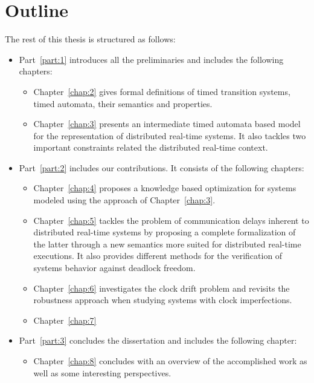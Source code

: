 \section{Outline}
The rest of this thesis is structured as follows:
\begin{itemize}
  \item Part~\ref{part:1} introduces all the preliminaries and includes the following chapters:
    \begin{itemize}
      \item Chapter~\ref{chap:2} gives formal definitions of timed transition systems,
        timed automata, their semantics and properties.
      \item Chapter~\ref{chap:3} presents an intermediate timed automata based model for 
        the representation of distributed real-time systems. It also tackles two important
        constraints related the distributed real-time context.
    \end{itemize}
  \item Part~\ref{part:2} includes our contributions. It consists of the following chapters:
    \begin{itemize}
      \item Chapter~\ref{chap:4} proposes a knowledge based optimization for systems modeled
        using the approach of Chapter~\ref{chap:3}.
      \item Chapter~\ref{chap:5} tackles the problem of communication delays inherent to
        distributed real-time systems by proposing a complete formalization of the latter through
        a new semantics more suited for distributed real-time executions. 
        It also provides different methods for the verification of systems behavior against 
        deadlock freedom.
      \item Chapter~\ref{chap:6} investigates the clock drift problem and revisits the robustness
        approach when studying systems with clock imperfections.    
      \item Chapter~\ref{chap:7}
    \end{itemize}
  \item Part~\ref{part:3} concludes the dissertation and includes the following chapter:
    \begin{itemize}
      \item Chapter~\ref{chap:8} concludes with an overview of the accomplished work as well as 
        some interesting perspectives.
    \end{itemize}
\end{itemize}

